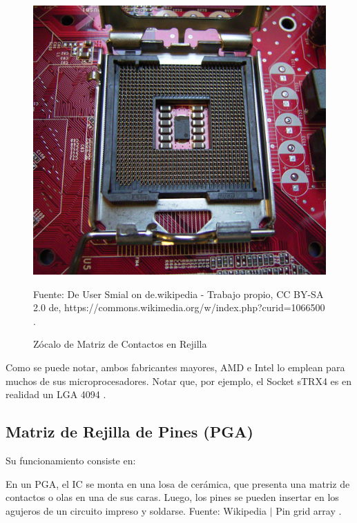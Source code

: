 \documentclass[conference]{IEEEtran}
\begin{document}
\begin{figure}[H]
    \centering
    \includegraphics[width=0.2\paperwidth]{images/lga-socket.jpg}
    \caption{Zócalo de Matriz de Contactos en Rejilla} \footnotesize
    Fuente: De User Smial on de.wikipedia - Trabajo propio, CC BY-SA 2.0 de, https://commons.wikimedia.org/w/index.php?curid=1066500 \cite{wikipedia-lga-2021D}.
\end{figure}

\bigbreak

Como se puede notar, ambos fabricantes mayores, AMD e Intel lo emplean para muchos de sus microprocesadores. Notar que, por ejemplo, el Socket sTRX4 es en realidad un LGA 4094 \cite{wikipedia-lga-2021D}.

\subsection{Matriz de Rejilla de Pines (PGA)}

Su funcionamiento consiste en:

\bigbreak

\begin{displayquote}
    En un PGA, el IC se monta en una losa de cerámica, que presenta una matriz de contactos o olas en una de sus caras. Luego, los pines se pueden insertar en los agujeros de un circuito impreso y soldarse.
    \small
    Fuente: Wikipedia $\mid$ Pin grid array \cite{wikipedia-pga-2021C}.
\end{displayquote}
\end{document}
